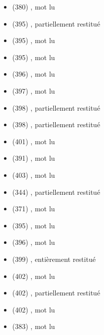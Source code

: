 \begin{itemize}[leftmargin=1.2em,itemsep=0pt]
\item {} (380) , mot lu
\item {} (395) , partiellement restitué
\item {} (395) , mot lu
\item {} (395) , mot lu
\item {} (396) , mot lu
\item {} (397) , mot lu
\item {} (398) , partiellement restitué
\item {} (398) , partiellement restitué
\item {} (401) , mot lu
\item {} (391) , mot lu
\item {} (403) , mot lu
\item {} (344) , partiellement restitué
\item {} (371) , mot lu
\item {} (395) , mot lu
\item {} (396) , mot lu
\item {} (399) , entièrement restitué
\item {} (402) , mot lu
\item {} (402) , partiellement restitué
\item {} (402) , mot lu
\item {} (383) , mot lu
\end{itemize}

